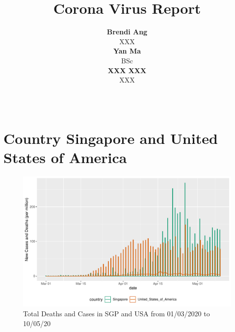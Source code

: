 \documentclass[11pt,a4paper,]{article}
\title{Corona Virus Report}
\author{\sf\Large\textbf{ Brendi Ang}\\ {\sf\large XXX\\[0.5cm]} \sf\Large\textbf{ Yan Ma}\\ {\sf\large BSc\\[0.5cm]} \sf\Large\textbf{ XXX XXX}\\ {\sf\large XXX\\[0.5cm]}}
\date{\sf\Date~\Month~\Year}
\makeatletter
\def\titlepage{\front{\expandafter{\@title}}{\@author}{\@organization}}
\makeatother
\begin{document}
\titlepage

\section*{Country Singapore and United States of America}

\begin{figure}
\centering
\includegraphics{report_files/figure-latex/sgp-usa-barchart-1.pdf}
\caption{\label{fig:sgp-usa-barchart}Total Deaths and Cases in SGP and USA from 01/03/2020 to 10/05/20}
\end{figure}
\end{document}

